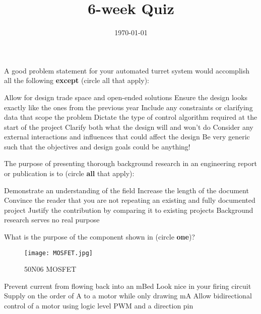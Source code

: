 \documentclass[addpoints,answers]{exam}
\title{6-week Quiz}
\author{\usnaInstructorShort}
\date{\today}
\begin{document}
\maketitle

\begin{questions}
\question
A good problem statement for your automated turret system would accomplish all the following {\bf except} (circle all that apply):
\begin{choices}
\CorrectChoice Allow for design trade space and open-ended solutions
\choice Ensure the design looks exactly like the ones from the previous year  
\CorrectChoice Include any constraints or clarifying data that scope the problem
\choice Dictate the type of control algorithm required at the start of the project
\CorrectChoice Clarify both what the design will and won't do 
\CorrectChoice Consider any external interactions and influences that could affect the design
\choice Be very generic such that the objectives and design goals could be anything!
\end{choices}





\question
The purpose of presenting thorough background research in an engineering report or publication is to (circle {\bf all} that apply):
\begin{choices}
\CorrectChoice Demonstrate an understanding of the field
\choice Increase the length of the document 
\CorrectChoice Convince the reader that you are not repeating an existing and fully documented project
\CorrectChoice Justify the contribution by comparing it to existing projects
\choice Background research serves no real purpose
\end{choices}




\question
What is the purpose of the component shown in  (circle {\bf one})?
\begin{figure}[h]
\centering
	\texttt{[image: MOSFET.jpg]}
	\caption{50N06 MOSFET}
	\label{fig:MOSFET}
\end{figure}

\begin{choices}
\choice Prevent current from flowing back into an mBed
\choice Look nice in your firing circuit
\CorrectChoice Supply on the order of \si{\ampere} to a motor while only drawing \si{\milli\ampere}
\choice Allow bidirectional control of a motor using logic level PWM and a direction pin
\end{choices}






\end{questions}
\end{document}
